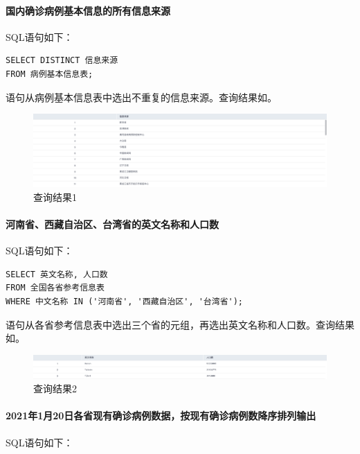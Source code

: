 \documentclass[lang=cn,11pt,a4paper,cite=authornum]{paper}
\begin{document}
\paragraph{国内确诊病例基本信息的所有信息来源} SQL语句如下：

\begin{code}
\begin{verbatim}
SELECT DISTINCT 信息来源
FROM 病例基本信息表;
\end{verbatim}
\end{code}

语句从病例基本信息表中选出不重复的信息来源。查询结果如。

\begin{figure}[!htb]
    \centering
    \includegraphics[width=\textwidth]{./images/lab1_query1.png}
    \caption{查询结果1\label{fig:query1}}
\end{figure}

\paragraph{河南省、西藏自治区、台湾省的英文名称和人口数} SQL语句如下：

\begin{code}
\begin{verbatim}
SELECT 英文名称, 人口数
FROM 全国各省参考信息表
WHERE 中文名称 IN ('河南省', '西藏自治区', '台湾省');
\end{verbatim}
\end{code}

语句从各省参考信息表中选出三个省的元组，再选出英文名称和人口数。查询结果如。

\begin{figure}[!htb]
    \centering
    \includegraphics[width=\textwidth]{./images/lab1_query2.png}
    \caption{查询结果2\label{fig:query2}}
\end{figure}

\paragraph{2021年1月20日各省现有确诊病例数据，按现有确诊病例数降序排列输出} SQL语句如下：
\end{document}
